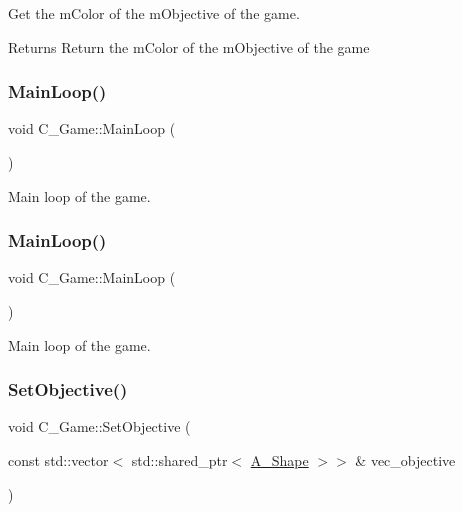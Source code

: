 Get the m\+Color of the m\+Objective of the game. 

\begin{DoxyReturn}{Returns}
Return the m\+Color of the m\+Objective of the game 
\end{DoxyReturn}
\mbox{\label{classC__Game_aa15149075c2a4bd4704235d83c1c4f20}} 
\subsubsection{\texorpdfstring{Main\+Loop()}{MainLoop()}\hspace{0.1cm}{\footnotesize\ttfamily [1/2]}}
{\footnotesize\ttfamily void C\+\_\+\+Game\+::\+Main\+Loop (\begin{DoxyParamCaption}{ }\end{DoxyParamCaption})}



Main loop of the game. 

\mbox{\label{classC__Game_aa15149075c2a4bd4704235d83c1c4f20}} 
\subsubsection{\texorpdfstring{Main\+Loop()}{MainLoop()}\hspace{0.1cm}{\footnotesize\ttfamily [2/2]}}
{\footnotesize\ttfamily void C\+\_\+\+Game\+::\+Main\+Loop (\begin{DoxyParamCaption}{ }\end{DoxyParamCaption})}



Main loop of the game. 

\mbox{\label{classC__Game_a0fa57725991fb2b249eb40dd776a68c4}} 
\subsubsection{\texorpdfstring{Set\+Objective()}{SetObjective()}\hspace{0.1cm}{\footnotesize\ttfamily [1/2]}}
{\footnotesize\ttfamily void C\+\_\+\+Game\+::\+Set\+Objective (\begin{DoxyParamCaption}\item[{const std\+::vector$<$ std\+::shared\+\_\+ptr$<$ \hyperlink{classA__Shape}{A\+\_\+\+Shape} $>$$>$ \&}]{vec\+\_\+objective }\end{DoxyParamCaption})}



